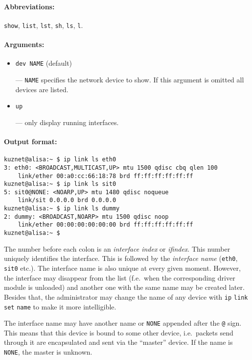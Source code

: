 \paragraph{Abbreviations:} \verb|show|, \verb|list|, \verb|lst|, \verb|sh|, \verb|ls|,
\verb|l|.

\paragraph{Arguments:}
\begin{itemize}
\item \verb|dev NAME| (default)

--- \verb|NAME| specifies the network device to show.
If this argument is omitted all devices are listed.

\item \verb|up|

--- only display running interfaces.

\end{itemize}


\paragraph{Output format:}

\begin{verbatim}
kuznet@alisa:~ $ ip link ls eth0
3: eth0: <BROADCAST,MULTICAST,UP> mtu 1500 qdisc cbq qlen 100
    link/ether 00:a0:cc:66:18:78 brd ff:ff:ff:ff:ff:ff
kuznet@alisa:~ $ ip link ls sit0
5: sit0@NONE: <NOARP,UP> mtu 1480 qdisc noqueue
    link/sit 0.0.0.0 brd 0.0.0.0
kuznet@alisa:~ $ ip link ls dummy
2: dummy: <BROADCAST,NOARP> mtu 1500 qdisc noop
    link/ether 00:00:00:00:00:00 brd ff:ff:ff:ff:ff:ff
kuznet@alisa:~ $ 
\end{verbatim}


The number before each colon is an {\em interface index\/} or {\em ifindex\/}.
This number uniquely identifies the interface. This is followed by the {\em interface name\/}
(\verb|eth0|, \verb|sit0| etc.). The interface name is also
unique at every given moment. However, the interface may disappear from the
list (f.e.\ when the corresponding driver module is unloaded) and another
one with the same name may be created later. Besides that,
the administrator may change the name of any device with
\verb|ip| \verb|link| \verb|set| \verb|name|
to make it more intelligible.

The interface name may have another name or \verb|NONE| appended 
after the \verb|@| sign. This means that this device is bound to some other
device,
i.e.\ packets send through it are encapsulated and sent via the ``master''
device. If the name is \verb|NONE|, the master is unknown.

